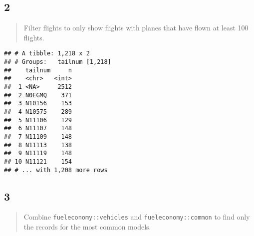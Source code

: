 \documentclass[]{ltjsarticle}
\newenvironment{Shaded}{\begin{snugshade}}{\end{snugshade}}
\newcommand{\DataTypeTok}[1]{\textcolor[rgb]{0.13,0.29,0.53}{#1}}
\newcommand{\DecValTok}[1]{\textcolor[rgb]{0.00,0.00,0.81}{#1}}
\newcommand{\KeywordTok}[1]{\textcolor[rgb]{0.13,0.29,0.53}{\textbf{#1}}}
\newcommand{\NormalTok}[1]{#1}
\newcommand{\OperatorTok}[1]{\textcolor[rgb]{0.81,0.36,0.00}{\textbf{#1}}}
\newcommand{\StringTok}[1]{\textcolor[rgb]{0.31,0.60,0.02}{#1}}
\begin{document}
\hypertarget{section-19}{%
\subsection{2}\label{section-19}}

\begin{quote}
Filter flights to only show flights with planes that have flown at least
100 flights.
\end{quote}

\begin{Shaded}
\end{Shaded}

\begin{verbatim}
## # A tibble: 1,218 x 2
## # Groups:   tailnum [1,218]
##    tailnum     n
##    <chr>   <int>
##  1 <NA>     2512
##  2 N0EGMQ    371
##  3 N10156    153
##  4 N10575    289
##  5 N11106    129
##  6 N11107    148
##  7 N11109    148
##  8 N11113    138
##  9 N11119    148
## 10 N11121    154
## # ... with 1,208 more rows
\end{verbatim}

\hypertarget{section-20}{%
\subsection{3}\label{section-20}}

\begin{quote}
Combine \texttt{fueleconomy::vehicles} and \texttt{fueleconomy::common}
to find only the records for the most common models.
\end{quote}

\begin{Shaded}
\end{Shaded}
\end{document}
